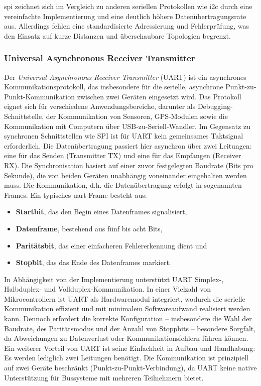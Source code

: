 \gls{spi} zeichnet sich im Vergleich zu anderen seriellen Protokollen wie \gls{i2c} durch eine vereinfachte Implementierung und eine deutlich höhere Datenübertragungsrate aus. 
Allerdings fehlen eine standardisierte Adressierung und Fehlerprüfung, was den Einsatz auf kurze Distanzen und überschaubare Topologien begrenzt. 


\subsubsection*{Universal Asynchronous Receiver Transmitter}
Der \emph{Universal Asynchronous Receiver Transmitter} (UART) ist ein asynchrones Kommunikationsprotokoll, das insbesondere für die serielle, asynchrone Punkt-zu-Punkt-Kommunikation zwischen zwei Geräten eingesetzt wird. 
Das Protokoll eignet sich für verschiedene Anwendungsbereiche, darunter als Debugging-Schnittstelle, der Kommunikation von Sensoren, GPS-Modulen sowie die Kommunikation mit Computern über USB-zu-Seriell-Wandler. 
Im Gegensatz zu synchronen Schnittstellen wie SPI ist für UART kein gemeinsames Taktsignal erforderlich.
Die Datenübertragung passiert hier asynchron über zwei Leitungen: eine für das Senden (Transmitter TX) und eine für das Empfangen (Receiver RX).
Die Synchronisation basiert auf einer zuvor festgelegten Baudrate (Bits pro Sekunde), die von beiden Geräten unabhängig voneinander eingehalten werden muss.
Die Kommunikation, d.h. die Datenübertragung erfolgt in sogenannten Frames. Ein typisches \gls{uart}-Frame besteht aus:
\begin{itemize}
	\item \textbf{Startbit}, das den Begin eines Datenframes signalisiert,
	\item \textbf{Datenframe}, bestehend aus fünf bis acht Bits,
	\item \textbf{Paritätsbit}, das einer einfacheren Fehlererkennung dient und
	\item \textbf{Stopbit}, das das Ende des Datenframes markiert.
\end{itemize}

In Abhängigkeit von der Implementierung unterstützt UART Simplex-, Halbduplex- und Vollduplex-Kommunikation. 
In einer Vielzahl von Mikrocontrollern ist UART als Hardwaremodul integriert, wodurch die serielle Kommunikation effizient und mit minimalem Softwareaufwand realisiert werden kann. 
Dennoch erfordert die korrekte Konfiguration – insbesondere die Wahl der Baudrate, des Paritätsmodus und der Anzahl von Stoppbits – besondere Sorgfalt, da Abweichungen zu Datenverlust oder Kommunikationsfehlern führen können.
Ein weiterer Vorteil von UART ist seine Einfachheit in Aufbau und Handhabung: Es werden lediglich zwei Leitungen benötigt. 
Die Kommunikation ist prinzipiell auf zwei Geräte beschränkt (Punkt-zu-Punkt-Verbindung), da UART keine native Unterstützung für Bussysteme mit mehreren Teilnehmern bietet.

